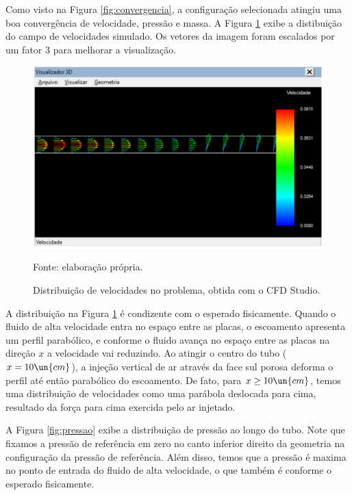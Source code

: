 Como visto na Figura \ref*{fig:convergencia}, a configuração selecionada atingiu uma boa  
convergência de velocidade, pressão e massa. A Figura \ref*{fig:velocidades} exibe a 
distibuição do campo de velocidades simulado. Os vetores da imagem foram escalados por um fator
3 para melhorar a visualização.

\begin{figure}[h!]
    \caption{Distribuição de velocidades no problema, obtida com o CFD Studio.}
    \label{fig:velocidades}
    \centering
    \centerline{\includegraphics[scale=0.45]{velocidades.png}}
    \par{Fonte: elaboração própria.}
\end{figure}

A distribuição na Figura \ref*{fig:velocidades} é condizente com o esperado fisicamente. Quando 
o fluido de alta velocidade entra no espaço entre as placas, o escoamento apresenta um perfil
parabólico, e conforme o fluido avança no espaço entre as placas na direção $x$ a 
velocidade vai reduzindo. Ao atingir o centro do tubo ($x = 10 \un{cm}$), a injeção
vertical de ar através da face sul porosa deforma o perfil até então parabólico do escoamento.
De fato, para $x \geq 10 \un{cm}$, temos uma distribuição de velocidades como uma parábola deslocada
para cima, resultado da força para cima exercida pelo ar injetado.

A Figura \ref*{fig:pressao} exibe a distribuição de pressão ao longo do tubo. Note que fixamos a pressão de referência 
em zero no canto inferior direito da geometria na configuração da pressão de referência.
Além disso, temos que a pressão é maxima no ponto de entrada do fluido de alta velocidade,
o que também é conforme o esperado fisicamente.

